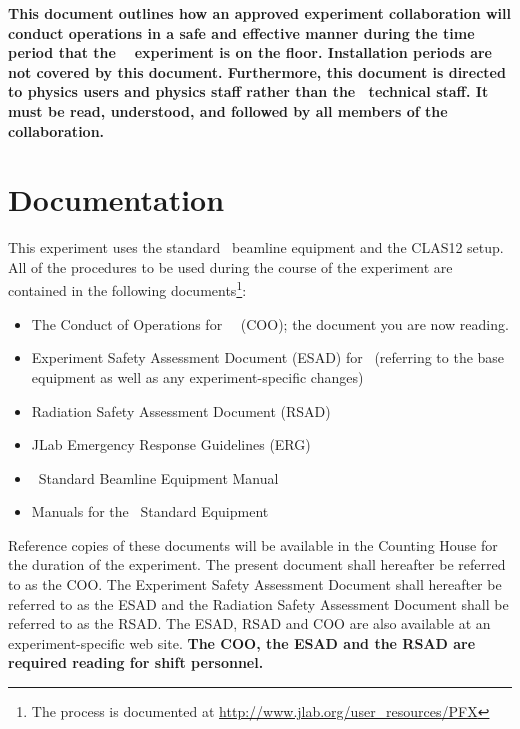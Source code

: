 \documentclass[11pt]{article}
\begin{document}
{\bf This document outlines how an approved experiment collaboration will conduct
operations in a safe and effective manner during the time period that the 
\EXPTS\  %
experiment is on the floor. Installation 
periods are not covered by this document. 
Furthermore, this document is directed to physics users and
physics staff rather than the \HALL\ technical staff.  It must be read, 
understood, and followed by all members of the collaboration. }

\section{Documentation}
\indent

This experiment uses the standard \HALL\ beamline equipment and the CLAS12 setup. 
All of the procedures to be used during the course of the experiment are contained in the following
documents\footnote{The process is documented at \url{http://www.jlab.org/user_resources/PFX} }:

\begin{itemize}

\item  The Conduct of Operations for \HALL\ \EXPTS\
 (COO); the document you are now reading. 

\item   Experiment Safety Assessment Document (ESAD)
for \EXPTS\ (referring to the base equipment as well as any 
experiment-specific changes)

\item Radiation Safety Assessment Document (RSAD) 

\item JLab Emergency Response Guidelines (ERG) 

\item \HALL\ Standard Beamline Equipment Manual 

\item Manuals for the \EXPTSabrev\ Standard Equipment 

\end{itemize}


Reference copies of these documents will be available in the Counting 
House for the duration of the experiment. The present document shall 
hereafter be referred to as the COO. The Experiment Safety Assessment 
Document shall hereafter be referred to as the ESAD and the
Radiation Safety Assessment Document shall be referred to as the RSAD.
The ESAD, RSAD and COO are also available at an experiment-specific 
web site. {\bf The COO, the ESAD and the RSAD are required reading for 
shift personnel.}
\end{document}
